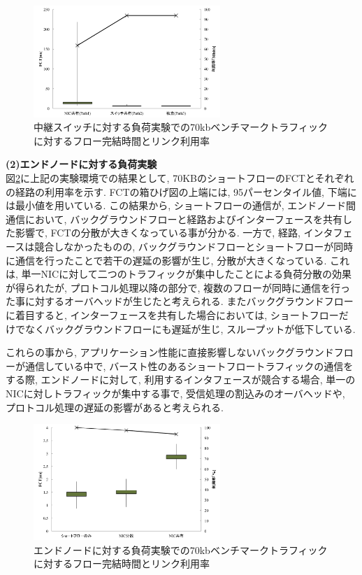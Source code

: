 \begin{figure}[t]
    \begin{center}
    \includegraphics[autoebb, width=200pt]{./img/switch_verif.pdf}
    \caption{中継スイッチに対する負荷実験での70kbベンチマークトラフィックに対するフロー完結時間とリンク利用率}
    \label{fig:improve}
    \end{center}
\end{figure}


{\bf (2)エンドノードに対する負荷実験}\\
図\ref{fig:real_exp0}に上記の実験環境での結果として,
70KBのショートフローのFCTとそれぞれの経路の利用率を示す.
FCTの箱ひげ図の上端には, 95パーセンタイル値, 下端には最小値を用いている.
この結果から, ショートフローの通信が, エンドノード間通信において, バックグラウンドフローと経路およびインターフェースを共有した影響で,
FCTの分散が大きくなっている事が分かる.
一方で, 経路, インタフェースは競合しなかったものの, バックグラウンドフローとショートフローが同時に通信を行ったことで若干の遅延の影響が生じ,
分散が大きくなっている.
これは, 単一NICに対して二つのトラフィックが集中したことによる負荷分散の効果が得られたが, プロトコル処理以降の部分で,
複数のフローが同時に通信を行った事に対するオーバヘッドが生じたと考えられる.
またバックグラウンドフローに着目すると, インターフェースを共有した場合においては,
ショートフローだけでなくバックグラウンドフローにも遅延が生じ, スループットが低下している.

これらの事から, アプリケーション性能に直接影響しないバックグラウンドフローが通信している中で,
バースト性のあるショートフロートラフィックの通信をする際, エンドノードに対して, 利用するインタフェースが競合する場合,
単一のNICに対しトラフィックが集中する事で, 受信処理の割込みのオーバヘッドや, プロトコル処理の遅延の影響があると考えられる.


\begin{figure}[t]
    \begin{center}
    \includegraphics[autoebb, width=200pt]{./img/real_eth0.pdf}
    \caption{エンドノードに対する負荷実験での70kbベンチマークトラフィックに対するフロー完結時間とリンク利用率}
    \label{fig:real_exp0}
    \end{center}
\end{figure}

